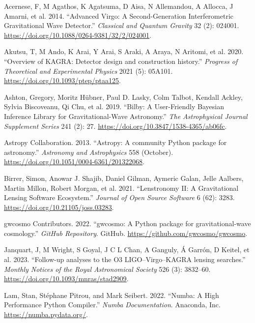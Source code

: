 \documentclass[10pt,a4paper,onecolumn]{article}
\newlength{\cslhangindent}
\newenvironment{CSLReferences}[3] %
 {%
  \setlength{\parindent}{0pt}
  \ifodd #1 \everypar{\setlength{\hangindent}{\cslhangindent}}\ignorespaces\fi
  \ifnum #2 > 0
  \setlength{\parskip}{#2\baselineskip}
  \fi
 }%
 {}
\begin{document}
\label{refs}
\begin{CSLReferences}{1}{0}
\bibitem[\citeproctext]{ref-VIRGO2015}
Acernese, F, M Agathos, K Agatsuma, D Aisa, N Allemandou, A Allocca, J
Amarni, et al. 2014. {``Advanced Virgo: A Second-Generation
Interferometric Gravitational Wave Detector.''} \emph{Classical and
Quantum Gravity} 32 (2): 024001.
\url{https://doi.org/10.1088/0264-9381/32/2/024001}.

Akutsu, T, M Ando, K Arai, Y Arai, S Araki, A Araya, N Aritomi, et al.
2020. {``{Overview of KAGRA: Detector design and construction
history}.''} \emph{Progress of Theoretical and Experimental Physics}
2021 (5): 05A101. \url{https://doi.org/10.1093/ptep/ptaa125}.

Ashton, Gregory, Moritz Hübner, Paul D. Lasky, Colm Talbot, Kendall
Ackley, Sylvia Biscoveanu, Qi Chu, et al. 2019. {``Bilby: A
User-Friendly Bayesian Inference Library for Gravitational-Wave
Astronomy.''} \emph{The Astrophysical Journal Supplement Series} 241
(2): 27. \url{https://doi.org/10.3847/1538-4365/ab06fc}.

Astropy Collaboration. 2013. {``{Astropy: A community Python package for
astronomy}.''} \emph{Astronomy and Astrophysics} 558 (October).
\url{https://doi.org/10.1051/0004-6361/201322068}.

Birrer, Simon, Anowar J. Shajib, Daniel Gilman, Aymeric Galan, Jelle
Aalbers, Martin Millon, Robert Morgan, et al. 2021. {``Lenstronomy II: A
Gravitational Lensing Software Ecosystem.''} \emph{Journal of Open
Source Software} 6 (62): 3283.
\url{https://doi.org/10.21105/joss.03283}.

gwcosmo Contributors. 2022. {``{gwcosmo: A Python package for
gravitational-wave cosmology}.''} \emph{GitHub Repository}. GitHub.
\url{https://github.com/gwcosmo/gwcosmo}.

Janquart, J, M Wright, S Goyal, J C L Chan, A Ganguly, Á Garrón, D
Keitel, et al. 2023. {``{Follow-up analyses to the O3 LIGO--Virgo--KAGRA
lensing searches}.''} \emph{Monthly Notices of the Royal Astronomical
Society} 526 (3): 3832--60.
\url{https://doi.org/10.1093/mnras/stad2909}.

Lam, Stan, Stéphane Pitrou, and Mark Seibert. 2022. {``Numba: A High
Performance Python Compiler.''} \emph{Numba Documentation}. Anaconda,
Inc. \url{https://numba.pydata.org/}.


\end{CSLReferences}
\end{document}
